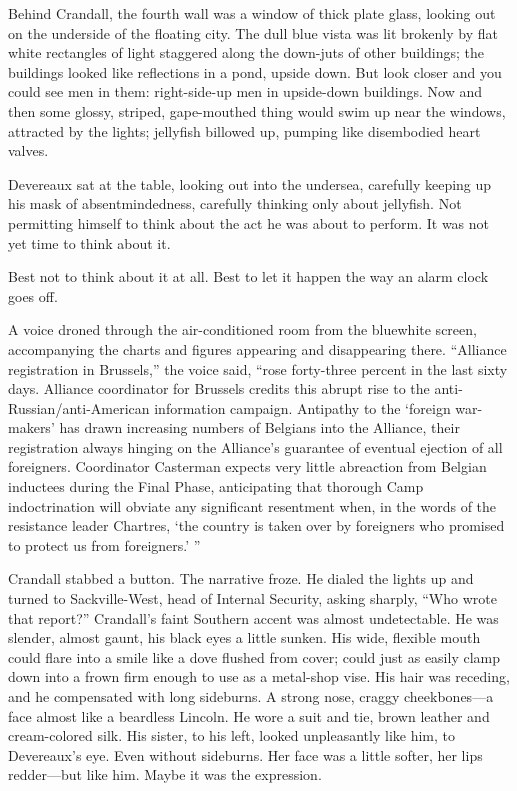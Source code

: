 Behind Crandall, the fourth wall was a window of thick plate glass, looking out on the underside of the floating city. The dull blue vista was lit brokenly by flat white rectangles of light staggered along the down-juts of other buildings; the buildings looked like reflections in a pond, upside down. But look closer and you could see men in them: right-side-up men in upside-down buildings. Now and then some glossy, striped, gape-mouthed thing would swim up near the windows, attracted by the lights; jellyfish billowed up, pumping like disembodied heart valves.

Devereaux sat at the table, looking out into the undersea, carefully keeping up his mask of absentmindedness, carefully thinking only about jellyfish. Not permitting himself to think about the act he was about to perform. It was not yet time to think about it.

Best not to think about it at all. Best to let it happen the way an alarm clock goes off.

A voice droned through the air-conditioned room from the bluewhite screen, accompanying the charts and figures appearing and disappearing there. “Alliance registration in Brussels,” the voice said, “rose forty-three percent in the last sixty days. Alliance coordinator for Brussels credits this abrupt rise to the anti-Russian/anti-American information campaign. Antipathy to the ‘foreign war-makers’ has drawn increasing numbers of Belgians into the Alliance, their registration always hinging on the Alliance’s guarantee of eventual ejection of all foreigners. Coordinator Casterman expects very little abreaction from Belgian inductees during the Final Phase, anticipating that thorough Camp indoctrination will obviate any significant resentment when, in the words of the resistance leader Chartres, ‘the country is taken over by foreigners who promised to protect us from foreigners.’ ”

Crandall stabbed a button. The narrative froze. He dialed the lights up and turned to Sackville-West, head of Internal Security, asking sharply, “Who wrote that report?” Crandall’s faint Southern accent was almost undetectable. He was slender, almost gaunt, his black eyes a little sunken. His wide, flexible mouth could flare into a smile like a dove flushed from cover; could just as easily clamp down into a frown firm enough to use as a metal-shop vise. His hair was receding, and he compensated with long sideburns. A strong nose, craggy cheekbones—a face almost like a beardless Lincoln. He wore a suit and tie, brown leather and cream-colored silk. His sister, to his left, looked unpleasantly like him, to Devereaux’s eye. Even without sideburns. Her face was a little softer, her lips redder—but like him. Maybe it was the expression.

